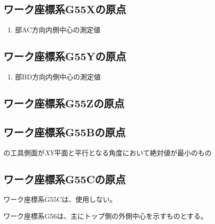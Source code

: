 \subsection{ワーク座標系{\ttfamily G55X}の原点}
\begin{enumerate}[label*=\sarrow]
\item \BottomEndFace 部AC方向内側中心の測定値
\end{enumerate}


\subsection{ワーク座標系{\ttfamily G55Y}の原点}
\begin{enumerate}[label*=\sarrow]
\item \BottomEndFace 部BD方向内側中心の測定値
\end{enumerate}


\subsection{ワーク座標系{\ttfamily G55Z}の原点\TBW}


\subsection{ワーク座標系{\ttfamily G55B}の原点}
\Jig の工具側面が$XY$平面と平行となる角度において絶対値が最小のもの


\subsection{ワーク座標系{\ttfamily G55C}の原点}
ワーク座標系{\ttfamily G55C}は、使用しない。



\clearpage
ワーク座標系{\ttfamily G56}は、主にトップ側の外側中心を示すものとする。


